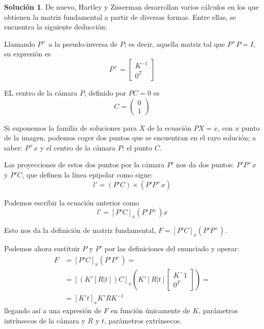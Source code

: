 \documentclass[a4paper, 11pt]{article}
\theoremstyle{definition}
\newtheorem*{solucion}{Solución}
\theoremstyle{theorem}
\begin{document}
    \begin{solucion}
        De nuevo, Hartley y Zisserman desarrollan varios cálculos en los que obtienen la matriz fundamental a partir de diversas formas. Entre ellas, se encuentra la siguiente deducción:

        Llamando $P^+$ a la pseudo-inversa de $P$; es decir, aquella matriz tal que $P^+ P = I$, su expresión es
        \[
        P^+ = \left[\begin{array}{c}
            K^{-1} \\
            0^T
        \end{array}\right]
        \]

        EL centro de la cámara $P$, definido por $PC = 0$ es
        \[
        C = \left(\begin{array}{c}
            0 \\
            1
        \end{array}\right)
        \]

        Si suponemos la familia de soluciones para $X$ de la ecuación $PX = x$, con $x$ punto de la imagen, podemos coger dos puntos que se encuentran en el rayo solución; a saber: $P^+x$ y el centro de la cámara $P$: el punto $C$.

        Las proyecciones de estos dos puntos por la cámara $P'$ nos da dos puntos: $P'P^+x$ y $P'C$, que definen la línea epipolar como sigue:
        \[
            l' = (P'C) \times (P'P^+x)
        \]

        Podemos escribir la ecuación anterior como
        \[
            l' =[P'C]_x(P'P^+)x
        \]

        Esto nos da la definición de matriz fundamental, $F = [P'C]_x(P'P^+)$.

        Podemos ahora sustituir $P$ y $P'$ por las definiciones del enunciado y operar:
        \begin{align*}
            F &= [P'C]_x(P'P^+) = \\
            &= [(K'[R|t])C]_x(K'[R|t]\left[\begin{array}{c}
                K^-1 \\
                0^T
            \end{array}\right]) = \\
            &= [K't]_xK'RK^{-1}
        \end{align*}
        llegando así a una expresión de $F$ en función únicamente de $K$, parámetros intrínsecos de la cámara y $R$ y $t$, parámetros extrínsecos.
    \end{solucion}
\end{document}
